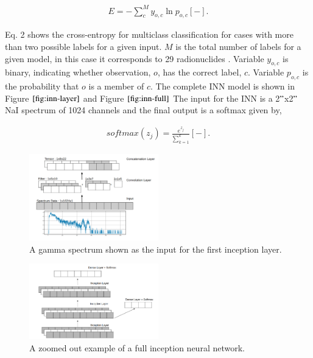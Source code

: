 \documentclass[fleqn]{anstrans}
\begin{document}
\begin{equation}
	\begin{aligned}
		E = -\sum_{c}^{M}y_{o,c}\ln{p_{o,c}} [-].
	\end{aligned}
\end{equation}

Eq. 2 shows the cross-entropy for multiclass classification for cases with more than two possible labels 
for a given input. $M$ is the total number of labels for a given model, in this case it corresponds to 29 
radionuclides \cite{AmericanNationalStandard2016}. Variable $y_{o,c}$ is binary, indicating whether observation, $o$, has the correct label, $c$. 
Variable $p_{o,c}$ is the probability that $o$ is a member of $c$. The complete INN model is shown in Figure $\ref{fig:inn-layer}$ and Figure $\ref{fig:inn-full}$ 
The input for the INN is a 2$"$x2$"$ NaI spectrum of 1024 channels and the final output is a softmax given by,



\begin{equation}
	\begin{aligned}
		softmax(z_j) = \frac{e^{z_j}}{\sum_{k=1}^{k}} [-].
	\end{aligned}
\end{equation}


\begin{figure}[ht]
    \centering
    \includegraphics[width=0.5\textwidth]{../figures/inn_layer_improved.png}
    \caption{A gamma spectrum shown as the input for the first inception layer.}
    \label{fig:inn-layer}
\end{figure}
\begin{figure}[ht]
    \centering
    \includegraphics[width=0.5\textwidth]{../figures/inn-full-figure.png}
    \caption{A zoomed out example of a full inception neural network.}
    \label{fig:inn-full}
\end{figure}
\end{document}
